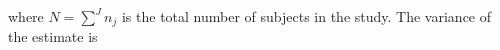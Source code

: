 where $N = \sum\limits^J n_j$ is the total number of subjects in the study. The variance of the estimate is